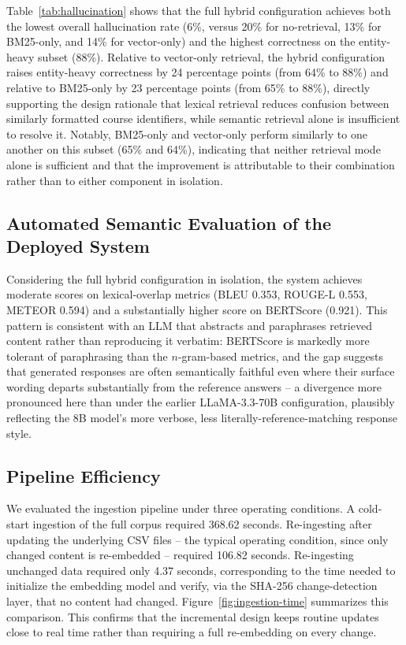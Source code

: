 \documentclass[a4paper,twoside]{article}
\begin{document}
Table~\ref{tab:hallucination} shows that the full hybrid configuration achieves both the lowest overall hallucination rate (6\%, versus 20\% for no-retrieval, 13\% for BM25-only, and 14\% for vector-only) and the highest correctness on the entity-heavy subset (88\%). Relative to vector-only retrieval, the hybrid configuration raises entity-heavy correctness by 24 percentage points (from 64\% to 88\%) and relative to BM25-only by 23 percentage points (from 65\% to 88\%), directly supporting the design rationale that lexical retrieval reduces confusion between similarly formatted course identifiers, while semantic retrieval alone is insufficient to resolve it. Notably, BM25-only and vector-only perform similarly to one another on this subset (65\% and 64\%), indicating that neither retrieval mode alone is sufficient and that the improvement is attributable to their combination rather than to either component in isolation.

\subsection{Automated Semantic Evaluation of the Deployed System}
\label{subsec:automated}

Considering the full hybrid configuration in isolation, the system achieves moderate scores on lexical-overlap metrics (BLEU 0.353, ROUGE-L 0.553, METEOR 0.594) and a substantially higher score on BERTScore (0.921). This pattern is consistent with an LLM that abstracts and paraphrases retrieved content rather than reproducing it verbatim: BERTScore is markedly more tolerant of paraphrasing than the $n$-gram-based metrics, and the gap suggests that generated responses are often semantically faithful even where their surface wording departs substantially from the reference answers -- a divergence more pronounced here than under the earlier LLaMA-3.3-70B configuration, plausibly reflecting the 8B model's more verbose, less literally-reference-matching response style.

\subsection{Pipeline Efficiency}

We evaluated the ingestion pipeline under three operating conditions. A cold-start ingestion of the full corpus required 368.62 seconds. Re-ingesting after updating the underlying CSV files -- the typical operating condition, since only changed content is re-embedded -- required 106.82 seconds. Re-ingesting unchanged data required only 4.37 seconds, corresponding to the time needed to initialize the embedding model and verify, via the SHA-256 change-detection layer, that no content had changed. Figure~\ref{fig:ingestion-time} summarizes this comparison. This confirms that the incremental design keeps routine updates close to real time rather than requiring a full re-embedding on every change.
\end{document}
